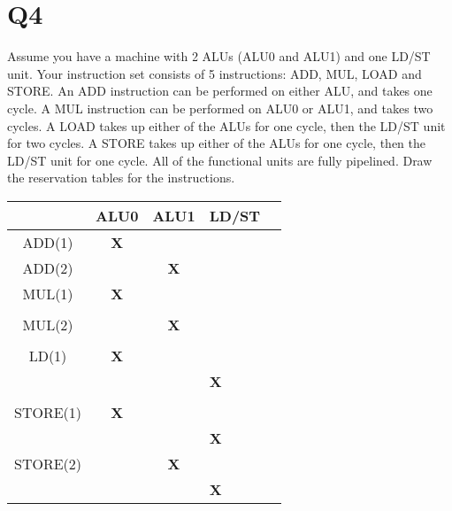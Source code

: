 \documentclass{report}
\begin{document}
\section{Q4}
\vspace{-1em}
\begin{multicols}{2}
Assume you have a machine with 2 ALUs (ALU0 and ALU1) and one LD/ST unit.
Your instruction set consists of 5 instructions: ADD, MUL, LOAD and STORE. An
ADD instruction can be performed on either ALU, and takes one cycle. A MUL
instruction can be performed on ALU0 or ALU1, and takes two cycles. A LOAD
takes up either of the ALUs for one cycle, then the LD/ST unit for two cycles. A
STORE takes up either of the ALUs for one cycle, then the LD/ST unit for one cycle.
All of the functional units are fully pipelined. Draw the reservation tables for the
instructions.
  \vfill\columnbreak
  \begin{tabular}{|c|>{\bfseries}c|>{\bfseries}c|>{\bfseries}l|>{\bfseries}l|}
    \hline
  	& ALU0   & ALU1 & LD/ST \\
    \hline
    ADD(1)   & X &   &  \\
    \hline
    ADD(2)   &   & X &  \\
    \hline
    MUL(1)   & X &   &  \\
             &   &   &  \\
    \hline
    MUL(2)   &   & X &  \\
             &   &   &  \\
    \hline
    LD(1)    & X &   &   \\
             &   &   & X \\
             &   &   &  \\
    \hline
    STORE(1) & X &   &   \\
             &   &   & X \\
    \hline
    STORE(2) &   & X &   \\
             &   &   & X \\
    \hline
  \end{tabular}
\end{multicols}
\end{document}
